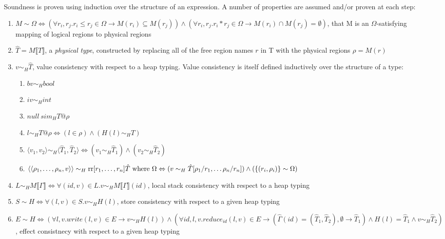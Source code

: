 Soundness is proven using induction over the structure of an expression.  A number of properties
are assumed and/or proven at each step: 
\begin{enumerate}
\item $M \sim \Omega \Leftrightarrow (\forall r_i, r_j. r_i \leq r_j \in \Omega \rightarrow M(r_i) \subseteq M(r_j)) \wedge (\forall r_i, r_j. r_i * r_j \in \Omega \rightarrow M(r_i) \cap M(r_j) = \emptyset)$, that M is an $\Omega$-satisfying mapping of logical regions to physical regions
\item $\hat T = M \llbracket T \rrbracket$, a {\em physical type}, constructed by replacing all of the free region names $r$ in T with the physical regions $\rho = M(r)$
\item $v \sim_H \hat T$, value consistency with respect to a heap typing.  Value consistency is
itself defined inductively over the structure of a type:
\begin{enumerate}
\item $bv \sim_H bool$
\item $iv \sim_H int$
\item $null \ sim_H T@\rho$
\item $l \sim_H T@\rho \Leftrightarrow (l \in \rho) \wedge (H(l) \sim_H T)$
\item $\langle v_1, v_2 \rangle \sim_H \langle \hat T_1, \hat T_2 \rangle \Leftrightarrow (v_1 \sim_H \hat T_1) \wedge (v_2 \sim_H \hat T_2)$
\item $\langle \langle {\rho}_1,\ldots,{\rho}_n, v \rangle \rangle \sim_H \text{rr}[{r}_1,\ldots,{r}_n] \hat T\text{ where }\Omega \Leftrightarrow (v \sim_H \hat T[\rho_1/r_1, \ldots \rho_n/r_n]) \wedge (\{ (r_i, \rho_i) \} \sim \Omega)$
\end{enumerate}
\item $L \sim_H M \llbracket \Gamma \rrbracket \Leftrightarrow \forall (id,v) \in L. v \sim_H M \llbracket \Gamma \rrbracket (id) $, local stack consistency with respect to a heap typing
\item $S \sim H \Leftrightarrow \forall (l,v) \in S. v \sim_H H(l)$, store consistency with respect to a given heap typing
\item $E \sim H \Leftrightarrow (\forall l, v. write(l,v) \in E \rightarrow v \sim_H H(l)) \wedge (\forall id, l, v. reduce_{id}(l, v) \in E \rightarrow (\hat \Gamma (id) = (\hat T_1, \hat T_2), \emptyset \rightarrow \hat T_1) \wedge H(l) = \hat T_1 \wedge v \sim_H \hat T_2)$, effect consistnecy with respect to a given heap typing
\end{enumerate}

